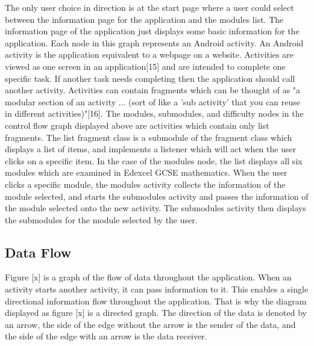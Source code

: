 \documentclass{article}
\begin{document}
The only user choice in direction is at the start page where a user could select between the information page for the application and the modules list. The information page of the application just displays some basic information for the application. Each node in this graph represents an Android activity. An Android activity is the application equivalent to a webpage on a website. Activities are viewed as one screen in an application[15] and are intended to complete one specific task. If another task needs completing then the application should call another activity. Activities can contain fragments which can be thought of as "a modular section of an activity ... (sort of like a 'sub activity' that you can reuse in different activities)"[16]. The modules, submodules, and difficulty nodes in the control flow graph displayed above are activities which contain only list fragments. The list fragment class is a submodule of the fragment class which displays a list of items, and implements a listener which will act when the user clicks on a specific item. In the case of the modules node, the list displays all six modules which are examined in Edexcel GCSE mathematics. When the user clicks a specific module, the modules activity collects the information of the module selected, and starts the submodules activity and passes the information of the module selected onto the new activity. The submodules activity then displays the submodules for the module selected by the user. \\




\subsection{Data Flow}

Figure [x] is a graph of the flow of data throughout the application. When an activity starts another activity, it can pass information to it. This enables a single directional information flow throughout the application. That is why the diagram displayed as figure [x] is a directed graph. The direction of the data is denoted by an arrow, the side of the edge without the arrow is the sender of the data, and the side of the edge with an arrow is the data receiver. 
\end{document}
